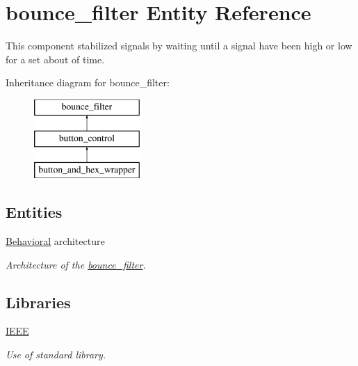 \hypertarget{classbounce__filter}{\section{bounce\-\_\-filter Entity Reference}
\label{classbounce__filter}
}


This component stabilized signals by waiting until a signal have been high or low for a set about of time.  


Inheritance diagram for bounce\-\_\-filter\-:\begin{figure}[H]
\begin{center}
\leavevmode
\includegraphics[height=3.000000cm]{classbounce__filter}
\end{center}
\end{figure}
\subsection*{Entities}
\begin{DoxyCompactItemize}
\item 
\hyperlink{classbounce__filter_1_1Behavioral}{Behavioral} architecture
\begin{DoxyCompactList}\small\item\em Architecture of the \hyperlink{classbounce__filter}{bounce\-\_\-filter}. \end{DoxyCompactList}\end{DoxyCompactItemize}
\subsection*{Libraries}
 \begin{DoxyCompactItemize}
\item 
\hypertarget{classbounce__filter_ae4f03c286607f3181e16b9aa12d0c6d4}{\hyperlink{classbounce__filter_ae4f03c286607f3181e16b9aa12d0c6d4}{I\-E\-E\-E} }\label{classbounce__filter_ae4f03c286607f3181e16b9aa12d0c6d4}

\begin{DoxyCompactList}\small\item\em Use of standard library. \end{DoxyCompactList}\end{DoxyCompactItemize}
